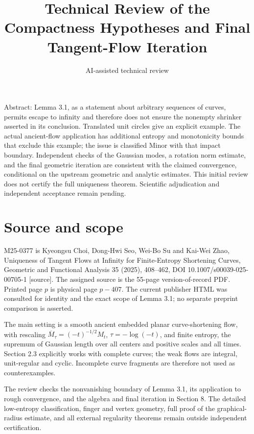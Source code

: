 \documentclass[10pt]{article}
\title{Technical Review of the Compactness Hypotheses and Final Tangent-Flow Iteration}
\author{AI-assisted technical review}
\date{}
\begin{document}
\maketitle
Abstract: Lemma 3.1, as a statement about arbitrary sequences of curves, permits escape to infinity and therefore does not ensure the nonempty shrinker asserted in its conclusion. Translated unit circles give an explicit example. The actual ancient-flow application has additional entropy and monotonicity bounds that exclude this example; the issue is classified Minor with that impact boundary. Independent checks of the Gaussian modes, a rotation norm estimate, and the final geometric iteration are consistent with the claimed convergence, conditional on the upstream geometric and analytic estimates. This initial review does not certify the full uniqueness theorem. Scientific adjudication and independent acceptance remain pending.\par
\section*{Source and scope}
M25-0377 is Kyeongsu Choi, Dong-Hwi Seo, Wei-Bo Su and Kai-Wei Zhao, Uniqueness of Tangent Flows at Infinity for Finite-Entropy Shortening Curves, Geometric and Functional Analysis 35 (2025), 408–462, DOI 10.1007/s00039-025-00705-1 [source]. The assigned source is the 55-page version-of-record PDF. Printed page \(p\) is physical page \(p-407\). The current publisher HTML was consulted for identity and the exact scope of Lemma 3.1; no separate preprint comparison is asserted.\par
The main setting is a smooth ancient embedded planar curve-shortening flow, with rescaling \(\overline M_\tau=(-t)^{-1/2}M_t\), \(\tau=-\log(-t)\), and finite entropy, the supremum of Gaussian length over all centers and positive scales and all times. Section 2.3 explicitly works with complete curves; the weak flows are integral, unit-regular and cyclic. Incomplete curve fragments are therefore not used as counterexamples.\par
The review checks the nonvanishing boundary of Lemma 3.1, its application to rough convergence, and the algebra and final iteration in Section 8. The detailed low-entropy classification, finger and vertex geometry, full proof of the graphical-radius estimate, and all external regularity theorems remain outside independent certification.\par
\end{document}
